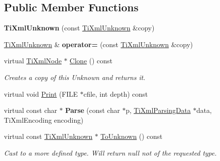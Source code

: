 \subsection*{Public Member Functions}
\begin{DoxyCompactItemize}
\item 
\mbox{\label{class_ti_xml_unknown_abe798ff4feea31474850c7f0de6bdf5e}} 
{\bfseries Ti\+Xml\+Unknown} (const \hyperlink{class_ti_xml_unknown}{Ti\+Xml\+Unknown} \&copy)
\item 
\mbox{\label{class_ti_xml_unknown_a60560b5aacb4bdc8b2b5f02f0a99c5c0}} 
\hyperlink{class_ti_xml_unknown}{Ti\+Xml\+Unknown} \& {\bfseries operator=} (const \hyperlink{class_ti_xml_unknown}{Ti\+Xml\+Unknown} \&copy)
\item 
\mbox{\label{class_ti_xml_unknown_a3dea7689de5b1931fd6657992948fde0}} 
virtual \hyperlink{class_ti_xml_node}{Ti\+Xml\+Node} $\ast$ \hyperlink{class_ti_xml_unknown_a3dea7689de5b1931fd6657992948fde0}{Clone} () const
\begin{DoxyCompactList}\small\item\em Creates a copy of this Unknown and returns it. \end{DoxyCompactList}\item 
virtual void \hyperlink{class_ti_xml_unknown_a5793fbc48ab3419783c0e866ca2d334e}{Print} (F\+I\+LE $\ast$cfile, int depth) const
\item 
\mbox{\label{class_ti_xml_unknown_aa51c2694e4177b5f0b5429ee5a81b58d}} 
virtual const char $\ast$ {\bfseries Parse} (const char $\ast$p, \hyperlink{class_ti_xml_parsing_data}{Ti\+Xml\+Parsing\+Data} $\ast$data, Ti\+Xml\+Encoding encoding)
\item 
\mbox{\label{class_ti_xml_unknown_a0d08dc16fc9ce16140ccaefbc35f6ea6}} 
virtual const \hyperlink{class_ti_xml_unknown}{Ti\+Xml\+Unknown} $\ast$ \hyperlink{class_ti_xml_unknown_a0d08dc16fc9ce16140ccaefbc35f6ea6}{To\+Unknown} () const
\begin{DoxyCompactList}\small\item\em Cast to a more defined type. Will return null not of the requested type. \end{DoxyCompactList}\item 

\end{DoxyCompactItemize}
